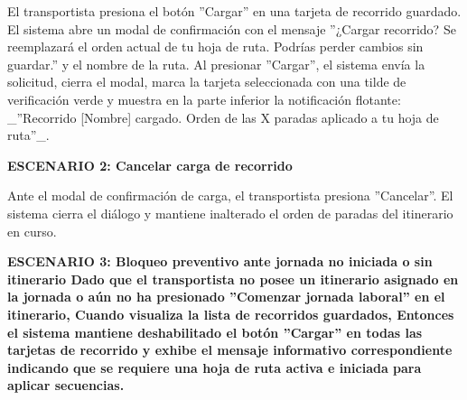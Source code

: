 \documentclass[a4paper,9pt]{article}
\begin{document}
\begin{tcolorbox}[hucard, title={\textbf{HU-64: CARGAR RECORRIDO} \hfill \scriptsize \colorbox{tealstatus}{\textbf{\ Accepted\ }} \quad \colorbox{white}{\textcolor{primarydark}{\textbf{\ 3 pts\ }}}}]
{El transportista presiona el botón ''Cargar'' en una tarjeta de recorrido guardado. El sistema abre un modal de confirmación con el mensaje ''¿Cargar recorrido? Se reemplazará el orden actual de tu hoja de ruta. Podrías perder cambios sin guardar.'' y el nombre de la ruta. Al presionar ''Cargar'', el sistema envía la solicitud, cierra el modal, marca la tarjeta seleccionada con una tilde de verificación verde y muestra en la parte inferior la notificación flotante: \_''Recorrido [Nombre] cargado. Orden de las X paradas aplicado a tu hoja de ruta''\_.\par\vspace{2.5pt}
\noindent\textbf{\textcolor{secondarydark}{ESCENARIO 2:  Cancelar carga de recorrido}}\par\vspace{1pt}
Ante el modal de confirmación de carga, el transportista presiona ''Cancelar''. El sistema cierra el diálogo y mantiene inalterado el orden de paradas del itinerario en curso.\par\vspace{2.5pt}
\noindent\textbf{\textcolor{secondarydark}{ESCENARIO 3:  Bloqueo preventivo ante jornada no iniciada o sin itinerario Dado que el transportista no posee un itinerario asignado en la jornada o aún no ha presionado ''Comenzar jornada laboral'' en el itinerario, Cuando visualiza la lista de recorridos guardados, Entonces el sistema mantiene deshabilitado el botón ''Cargar'' en todas las tarjetas de recorrido y exhibe el mensaje informativo correspondiente indicando que se requiere una hoja de ruta activa e iniciada para aplicar secuencias.}}\par\vspace{1pt}
}\par
\end{tcolorbox}
\end{document}
